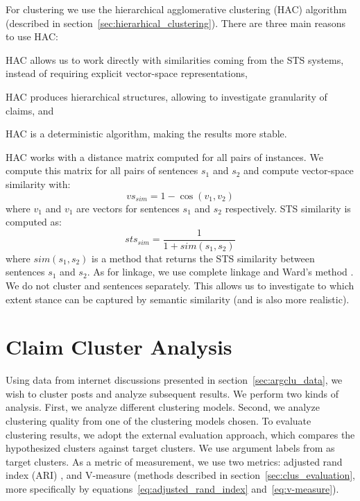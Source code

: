 For clustering we use the hierarchical agglomerative clustering (HAC) algorithm
(described in section~\ref{sec:hierarhical_clustering}). 
There are three main reasons to use HAC: 
\begin{enumerate*}
\item HAC allows us to work directly with similarities
coming from the STS systems, instead of requiring explicit vector-space representations, 
\item HAC produces hierarchical structures, allowing to investigate
granularity of claims, and
\item HAC is a deterministic algorithm, making the results more stable.
\end{enumerate*}
HAC works with a distance matrix computed for all pairs of instances. 
We compute this matrix for all pairs of sentences $s_1$ and $s_2$ and 
compute vector-space similarity with: 
$$
\mathit{vs_{sim}} = 1 - \cos(v_1, v_2)
$$ 
where $v_1$ and $v_1$ are vectors for sentences $s_1$ and $s_2$ respectively.
STS similarity is computed as:
$$
\mathit{sts_{sim}} = \frac{1}{1 + \mathit{sim}(s_1, s_2)}
$$
where $\mathit{sim}(s_1, s_2)$ is a method that returns the STS similarity
between sentences $s_1$ and $s_2$. 
As for linkage, we use complete linkage and Ward's method \citep{ward1963hierarchical}. 
We do not cluster  and  sentences separately. 
This allows us to investigate to which extent stance can be captured by 
semantic similarity (and is also more realistic). 

\section{Claim Cluster Analysis}
\label{sec:argclu_analysis}

Using data from internet discussions presented in section~\ref{sec:argclu_data}, 
we wish to cluster posts and analyze subsequent results. 
We perform two kinds of analysis. First, we analyze different clustering models. 
Second, we analyze clustering quality from one of the clustering models chosen. 
To evaluate clustering results, we adopt the external evaluation approach, which compares the 
hypothesized clusters against target clusters. 
We use argument labels from \citet{hasan2014you} as target clusters. 
As a metric of measurement, we use two metrics: 
adjusted rand index (ARI) 
\citep{steinley2004properties}, and V-measure \citep{rosenberg2007v}
(methods described in section~\ref{sec:clus_evaluation}, more specifically by 
equations~\ref{eq:adjusted_rand_index} and~\ref{eq:v-measure}). 

